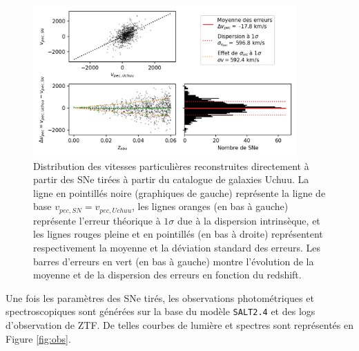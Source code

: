 \documentclass{book}
\def\saltd{\texttt{SALT2.4}\xspace}
\begin{document}
\begin{figure}[h]
	\centering
	\includegraphics[width=0.9\textwidth]{figures/vp_draw.png}
	\caption{Distribution des vitesses particulières reconstruites directement à partir des SNe tirées à partir du catalogue de galaxies Uchuu. La ligne en pointillés noire (graphiques de gauche) représente la ligne de base $v_{pec, SN} = v_{pec, Uchuu}$, les lignes oranges (en bas à gauche) représente l'erreur théorique à $1\sigma$ due à la dispersion intrinsèque, et les lignes rouges pleine et en pointillés (en bas à droite) représentent respectivement la moyenne et la déviation standard des erreurs. Les barres d'erreurs en vert (en bas à gauche) montre l'évolution de la moyenne et de la dispersion des erreurs en fonction du redshift.}
	\label{fig:vp_draw}
\end{figure}

Une fois les paramètres des SNe tirés, les observations photométriques et spectroscopiques sont générées sur la base du modèle \saltd et des logs d'observation de ZTF. De telles courbes de lumière et spectres sont représentés en Figure \ref{fig:obs}.
\end{document}
